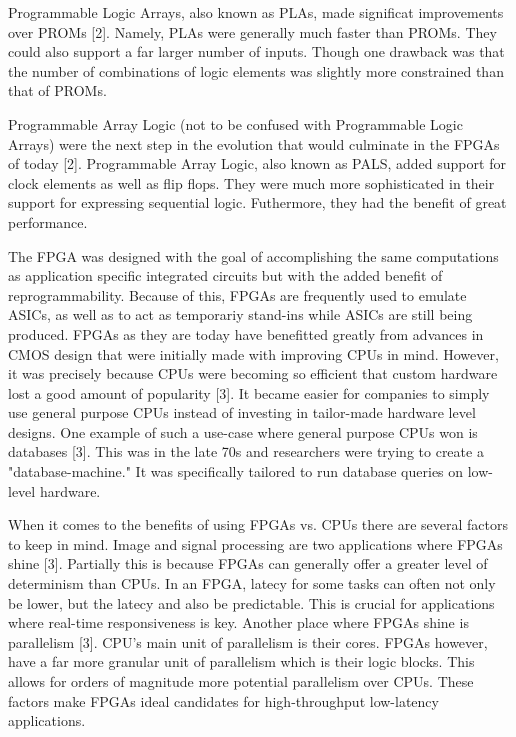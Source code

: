 \documentclass{article}
\begin{document}
    Programmable Logic Arrays, also known as PLAs, made significat improvements over PROMs [2].
    Namely, PLAs were generally much faster than PROMs. They could also support a far
    larger number of inputs. Though one drawback was that the number of combinations of
    logic elements was slightly more constrained than that of PROMs.

    Programmable Array Logic (not to be confused with Programmable Logic Arrays) were the next
    step in the evolution that would culminate in the FPGAs of today [2]. Programmable Array Logic,
    also known as PALS, added support for clock elements as well as flip flops. They
    were much more sophisticated in their support for expressing sequential logic. Futhermore,
    they had the benefit of great performance.

    The FPGA was designed with the goal of accomplishing the same computations as
    application specific integrated circuits
    but with the added benefit of reprogrammability. Because of this, FPGAs are frequently
    used to emulate ASICs, as well as to act as temporariy stand-ins while ASICs
    are still being produced. FPGAs as they are today have benefitted greatly
    from advances in CMOS design that were initially made with improving CPUs in mind.
    However, it was precisely because CPUs were becoming so efficient that custom hardware
    lost a good amount of popularity [3]. It became easier for companies to simply use
    general purpose CPUs instead of investing in tailor-made hardware level designs.
    One example of such a use-case where general purpose CPUs won is databases [3].
    This was in the late 70s and researchers were trying to create a "database-machine."
    It was specifically tailored to run database queries on low-level hardware.

    When it comes to the benefits of using FPGAs vs. CPUs there are several factors to keep in mind.
    Image and signal processing are two applications where FPGAs shine [3].
    Partially this is because FPGAs can generally offer a greater level of determinism
    than CPUs. In an FPGA, latecy for some tasks can often not only be lower, but the latecy
    and also be predictable. This is crucial for applications where real-time
    responsiveness is key. Another place where FPGAs shine is parallelism [3].
    CPU's main unit of parallelism is their cores. FPGAs however, have a far more granular
    unit of parallelism which is their logic blocks. This allows for orders of magnitude
    more potential parallelism over CPUs. These factors make FPGAs ideal candidates
    for high-throughput low-latency applications.
\end{document}
